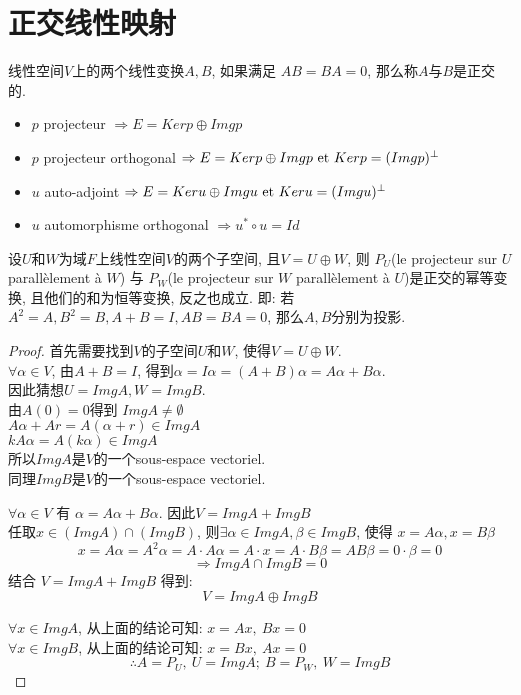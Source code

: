 \documentclass{book}
\begin{document}
\section{正交线性映射}
\begin{definition}
线性空间$V$上的两个线性变换$A, B$, 如果满足 $AB = BA = 0$, 那么称$A$与$B$是正交的.
\end{definition}

\begin{itemize}
\item $p$ projecteur $\Rightarrow E = Ker p \oplus Img p$
\item $p$ projecteur orthogonal $\Rightarrow E = Ker p \oplus Img p \textrm{\ et } Ker p = (Img p)^{\perp}$
\item $u$ auto-adjoint $\Rightarrow E = Ker u \oplus Img u \textrm{\ et } Ker u = (Img u)^{\perp}$
\item $u$ automorphisme orthogonal $\Rightarrow u^* \circ u = Id$
\end{itemize}

\begin{lemma}
设$U$和$W$为域$F$上线性空间$V$的两个子空间, 且$V = U \oplus W$, 则
$P_U$(le projecteur sur $U$ parall\`element \`a $W$) 与
$P_W$(le projecteur sur $W$ parall\`element \`a $U$)是正交的幂等变换, 且他们的和为恒等变换, 反之也成立.
即: 若$A^2 = A, B^2 = B, A + B = I, AB = BA = 0$, 那么$A, B$分别为投影.
\end{lemma}
\begin{proof}
首先需要找到$V$的子空间$U$和$W$, 使得$V = U \oplus W$. \\
$\forall \alpha \in V$, 由$A + B = I$, 得到$\alpha  = I \alpha = (A + B) \alpha = A \alpha + B \alpha$. \\
因此猜想$U = ImgA, W = ImgB$. \\
由$A(0) = 0$得到 $Img A \neq \emptyset$ \\
$A \alpha + A r = A(\alpha + r) \in Img A$ \\
$k A \alpha = A(k \alpha) \in Img A$ \\
所以$ImgA$是$V$的一个sous-espace vectoriel. \\
同理$ImgB$是$V$的一个sous-espace vectoriel.

$\forall \alpha \in V$ 有 $\alpha  = A \alpha + B \alpha$. 因此$V = Img A + Img B$ \\
任取$x \in (Img A) \cap (Img B)$, 则$\exists \alpha \in Img A, \beta \in Img B$, 使得 $x = A \alpha, x = B \beta$ \\
$$x = A \alpha = A^2 \alpha = A \cdot A \alpha = A \cdot x = A \cdot B \beta = AB \beta = 0 \cdot \beta = 0 $$
$$\Rightarrow Img A \cap Img B = 0$$
结合 $V = Img A + Img B$ 得到:
$$V = Img A \oplus Img B$$

$\forall x \in Img A$, 从上面的结论可知: $x = A x,~ B x = 0$ \\
$\forall x \in Img B$, 从上面的结论可知: $x = B x,~ A x = 0$ \\
$$\therefore A = P_U,~ U = Img A;~ B = P_W,~ W = Img B$$
\end{proof}
\end{document}
